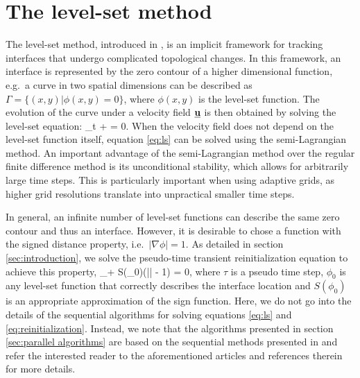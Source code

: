 \section{The level-set method}\label{sec:levelset method}
The level-set method, introduced in \cite{Osher;Sethian:88:Fronts-Propagating-w}, is an implicit framework for tracking interfaces that undergo complicated topological changes. In this framework, an interface is represented by the zero contour of a higher dimensional function, e.g.\ a curve in two spatial dimensions can be described as $\Gamma = \{(x,y) | \phi(x,y) = 0\}$, where $\phi(x,y)$ is the level-set function. The evolution of the curve under a velocity field $\underline{\mathbf{u}}$ is then obtained by solving the level-set equation:
\be
\phi_t + \underline{} \cdot \nabla \phi = 0.
\label{eq:ls}
\ee
When the velocity field does not depend on the level-set function itself, equation \eqref{eq:ls} can be solved using the semi-Lagrangian method. An important advantage of the semi-Lagrangian method over the regular finite difference method is its unconditional stability, which allows for arbitrarily large time steps. This is particularly important when using adaptive grids, as higher grid resolutions translate into unpractical smaller time steps.

In general, an infinite number of level-set functions can describe the same zero contour and thus an interface. However, it is desirable to chose a function with the signed distance property, i.e.\ $|\nabla \phi| = 1$. As detailed in section \ref{sec:introduction}, we solve the pseudo-time transient reinitialization equation \cite{Sussman;Smereka;Osher:94:A-Level-Set-Approach, Osher;Fedkiw:01:Level-Set-Methods:-A} to achieve this property,
\be
\phi_\tau + S(\phi_0)\left(|\nabla \phi| - 1\right) = 0,
\label{eq:reinitialization}
\ee
where $\tau$ is a pseudo time step, $\phi_0$ is any level-set function that correctly describes the interface location and $S(\phi_0)$ is an appropriate approximation of the sign function. Here, we do not go into the details of the sequential algorithms for solving equations \eqref{eq:ls} and \eqref{eq:reinitialization}. Instead, we note that the algorithms presented in section \ref{sec:parallel algorithms} are based on the sequential methods presented in \cite{Min;Gibou:07:A-second-order-accur} and refer the interested reader to the aforementioned articles and references therein for more details.


